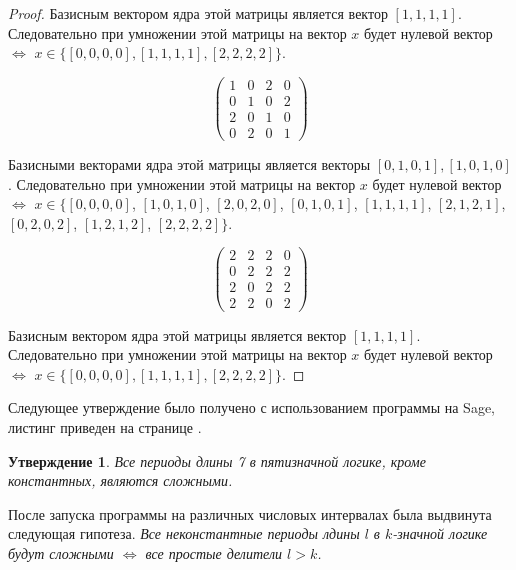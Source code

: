 \documentclass[bibliography=totoc, a4paper, 14pt]{extarticle}
\newtheorem*{myst}{Утверждение}
\begin{document}
\begin{proof}
Базисным вектором ядра этой матрицы является вектор $[1, 1, 1, 1]$. Следовательно при умножении этой матрицы на
вектор $x$ будет нулевой вектор $\Leftrightarrow$ $x \in \{[0, 0, 0, 0], [1, 1, 1, 1], [2, 2, 2, 2]\}$.

$$ \begin{pmatrix}
1 & 0 & 2 & 0 \\
0 & 1 & 0 & 2 \\
2 & 0 & 1 & 0 \\
0 & 2 & 0 & 1
\end{pmatrix} $$

Базисными векторами ядра этой матрицы является векторы $[0, 1, 0, 1], [1,0,1,0]$. Следовательно при умножении
этой матрицы на вектор $x$ будет нулевой вектор $\Leftrightarrow$ $x \in \{[0, 0, 0, 0]$, $[1, 0, 1, 0]$,
$[2, 0, 2, 0]$, $[0, 1, 0, 1]$, $[1, 1, 1, 1]$, $[2, 1, 2, 1]$, $[0, 2, 0, 2]$, $[1, 2, 1, 2]$, $[2, 2, 2, 2]\}$.

$$ \begin{pmatrix}
2 & 2 & 2 & 0 \\
0 & 2 & 2 & 2 \\
2 & 0 & 2 & 2 \\
2 & 2 & 0 & 2
\end{pmatrix} $$

Базисным вектором ядра этой матрицы является вектор $[1, 1, 1, 1]$. Следовательно при умножении этой матрицы на
вектор $x$ будет нулевой вектор $\Leftrightarrow$ $x \in \{[0, 0, 0, 0], [1, 1, 1, 1], [2, 2, 2, 2]\}$.
\end{proof}

\clearpage

Следующее утверждение было получено с использованием программы на {S}age,
листинг приведен на странице \pageref{sub:sage}.

\begin{myst}
Все периоды длины 7 в пятизначной логике, кроме константных, являются сложными.
\end{myst}

После запуска программы на различных числовых интервалах была выдвинута следующая гипотеза.
\emph{Все неконстантные периоды лдины $l$ в $k$\nobreakdash-значной логике будут сложными $\Leftrightarrow$
все простые делители $l > k$.}
\end{document}
